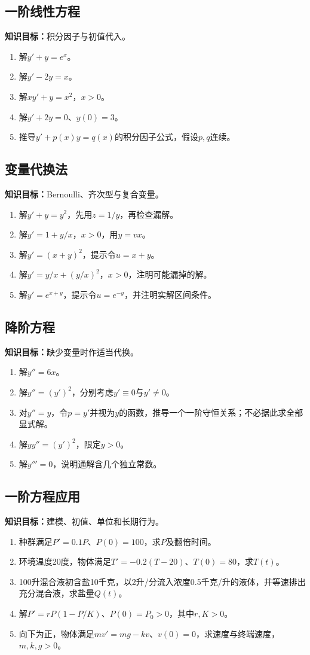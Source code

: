 \documentclass[11pt,a4paper,fontset=fandol]{ctexrep}
\newcommand{\goal}[1]{\textbf{知识目标：}#1\par}
\begin{document}
\subsection{一阶线性方程}
\goal{积分因子与初值代入。}
\begin{enumerate}
\item 解$y'+y=e^x$。
\item 解$y'-2y=x$。
\item 解$xy'+y=x^2$，$x>0$。
\item 解$y'+2y=0$、$y(0)=3$。
\item 推导$y'+p(x)y=q(x)$的积分因子公式，假设$p,q$连续。
\end{enumerate}
\subsection{变量代换法}
\goal{Bernoulli、齐次型与复合变量。}
\begin{enumerate}
\item 解$y'+y=y^2$，先用$z=1/y$，再检查漏解。
\item 解$y'=1+y/x$，$x>0$，用$y=vx$。
\item 解$y'=(x+y)^2$，提示令$u=x+y$。
\item 解$y'=y/x+(y/x)^2$，$x>0$，注明可能漏掉的解。
\item 解$y'=e^{x+y}$，提示令$u=e^{-y}$，并注明实解区间条件。
\end{enumerate}
\subsection{降阶方程}
\goal{缺少变量时作适当代换。}
\begin{enumerate}
\item 解$y''=6x$。
\item 解$y''=(y')^2$，分别考虑$y'\equiv0$与$y'\ne0$。
\item 对$y''=y$，令$p=y'$并视为$y$的函数，推导一个一阶守恒关系；不必据此求全部显式解。
\item 解$yy''=(y')^2$，限定$y>0$。
\item 解$y'''=0$，说明通解含几个独立常数。
\end{enumerate}
\subsection{一阶方程应用}
\goal{建模、初值、单位和长期行为。}
\begin{enumerate}
\item 种群满足$P'=0.1P$、$P(0)=100$，求$P$及翻倍时间。
\item 环境温度20度，物体满足$T'=-0.2(T-20)$、$T(0)=80$，求$T(t)$。
\item 100升混合液初含盐10千克，以2升/分流入浓度0.5千克/升的液体，并等速排出充分混合液，求盐量$Q(t)$。
\item 解$P'=rP(1-P/K)$、$P(0)=P_0>0$，其中$r,K>0$。
\item 向下为正，物体满足$mv'=mg-kv$、$v(0)=0$，求速度与终端速度，$m,k,g>0$。
\end{enumerate}
\end{document}
